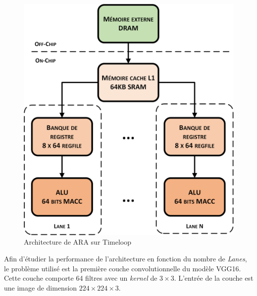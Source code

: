 \documentclass[11pt,letterpaper]{article}
\begin{document}
\begin{multicols}{2}
    \begin{figure}[H]
        \centering
        \includegraphics[width=\linewidth]{arch_visio.png}
        \caption{Architecture de ARA sur Timeloop}
        \label{fig:arch}
    \end{figure}

    Afin d'étudier la performance de l'architecture en fonction du nombre de \textit{Lanes}, le problème utilisé est la première 
    couche convolutionnelle du modèle VGG16. Cette couche comporte 64 filtres avec un \textit{kernel} de $3\times3$. L'entrée de la couche
    est une image de dimension $224\times224\times3$.  

    \end{multicols}


\pagebreak
\end{document}
